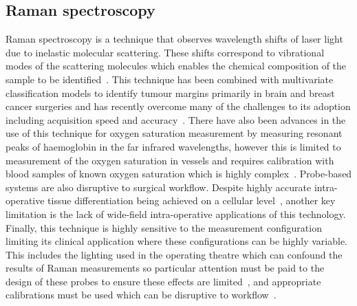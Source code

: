 \subsection{Raman spectroscopy}
Raman spectroscopy is a technique that observes wavelength shifts of laser light due to inelastic molecular scattering. These shifts correspond to vibrational modes of the scattering molecules which enables the chemical composition of the sample to be identified~\cite{Kong2015}. This technique has been combined with multivariate classification models to identify tumour margins primarily in brain and breast cancer surgeries and has recently overcome many of the challenges to its adoption including acquisition speed and accuracy~\cite{Kong2015, Fitzgerald2022}. There have also been advances in the use of this technique for oxygen saturation measurement by measuring resonant peaks of haemoglobin in the far infrared wavelengths, however this is limited to measurement of the oxygen saturation in vessels and requires calibration with blood samples of known oxygen saturation which is highly complex~\cite{TorresFilho2016}. Probe-based systems are also disruptive to surgical workflow. Despite highly accurate intra-operative tissue differentiation being achieved on a cellular level~\cite{Fitzgerald2022}, another key limitation is the lack of wide-field intra-operative applications of this technology. Finally, this technique is highly sensitive to the measurement configuration limiting its clinical application where these configurations can be highly variable. This includes the lighting used in the operating theatre which can confound the results of Raman measurements so particular attention must be paid to the design of these probes to ensure these effects are limited~\cite{Horsnell2016}, and appropriate calibrations must be used which can be disruptive to workflow~\cite{TorresFilho2016}.

